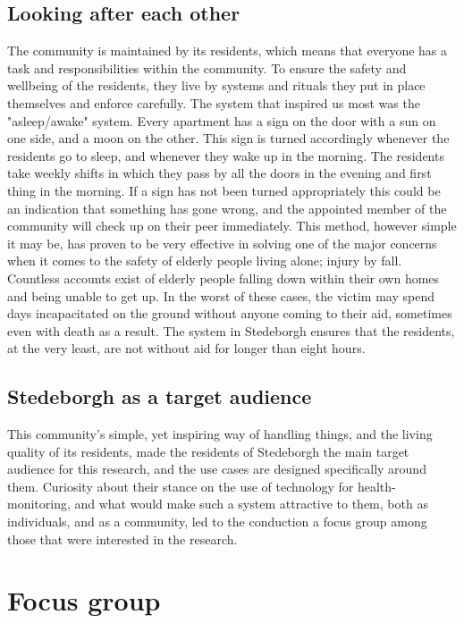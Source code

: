 \documentclass{below-ext}
\begin{document}
\subsection{Looking after each other}
The community is maintained by its residents, which means that everyone has a task and responsibilities within the community. To ensure the safety and wellbeing of the residents, they live by systems and rituals they put in place themselves and enforce carefully. The system that inspired us most was the "asleep/awake" system. Every apartment has a sign on the door with a sun on one side, and a moon on the other. This sign is turned accordingly whenever the residents go to sleep, and whenever they wake up in the morning. The residents take weekly shifts in which they pass by all the doors in the evening and first thing in the morning. If a sign has not been turned appropriately this could be an indication that something has gone wrong, and the appointed member of the community will check up on their peer immediately. This method, however simple it may be, has proven to be very effective in solving one of the major concerns when it comes to the safety of elderly people living alone; injury by fall. Countless accounts exist of elderly people falling down within their own homes and being unable to get up. In the worst of these cases, the victim may spend days incapacitated on the ground without anyone coming to their aid, sometimes even with death as a result. The system in Stedeborgh ensures that the residents, at the very least, are not without aid for longer than eight hours. 

\subsection{Stedeborgh as a target audience}
This community's simple, yet inspiring way of handling things, and the living quality of its residents, made the residents of Stedeborgh the main target audience for this research, and the use cases are designed specifically around them. Curiosity about their stance on the use of technology for health-monitoring, and what would make such a system attractive to them, both as individuals, and as a community, led to the conduction a focus group among those that were interested in the research.

\section{Focus group}
\end{document}
